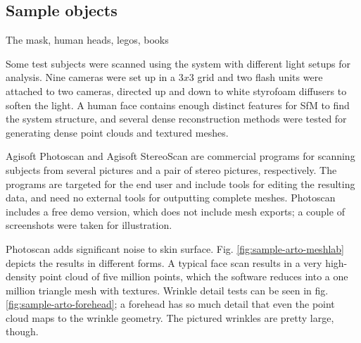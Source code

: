 \subsection{Sample objects}

The mask, human heads, legos, books

Some test subjects were scanned using the system with different light setups for analysis.
Nine cameras were set up in a $3 x 3$ grid and two flash units were attached to two cameras, directed up and down to white styrofoam diffusers to soften the light.
A human face contains enough distinct features for SfM to find the system structure, and several dense reconstruction methods were tested for generating dense point clouds and textured meshes.

Agisoft Photoscan and Agisoft StereoScan are commercial programs for scanning subjects from several pictures and a pair of stereo pictures, respectively. \cite{agisoft}
The programs are targeted for the end user and include tools for editing the resulting data, and need no external tools for outputting complete meshes.
Photoscan includes a free demo version, which does not include mesh exports; a couple of screenshots were taken for illustration.

Photoscan adds significant noise to skin surface.
Fig. \ref{fig:sample-arto-meshlab} depicts the results in different forms.
A typical face scan results in a very high-density point cloud of five million points, which the software reduces into a one million triangle mesh with textures.
Wrinkle detail tests can be seen in fig. \ref{fig:sample-arto-forehead}; a forehead has so much detail that even the point cloud maps to the wrinkle geometry.
The pictured wrinkles are pretty large, though.




